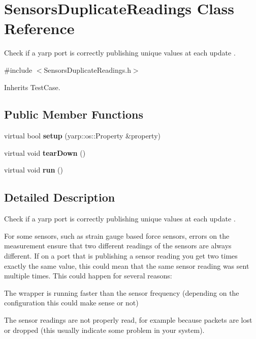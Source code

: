 \section{Sensors\+Duplicate\+Readings Class Reference}
\label{classSensorsDuplicateReadings}


Check if a yarp port is correctly publishing unique values at each update .  




{\ttfamily \#include $<$Sensors\+Duplicate\+Readings.\+h$>$}



Inherits Test\+Case.

\subsection*{Public Member Functions}
\begin{DoxyCompactItemize}
\item 
\mbox{\label{classSensorsDuplicateReadings_ab59f0ef1631d3e9e32319d7258cfb1f8}} 
virtual bool {\bfseries setup} (yarp\+::os\+::\+Property \&property)
\item 
\mbox{\label{classSensorsDuplicateReadings_a985c191f7133ff39409a5d30f93316cf}} 
virtual void {\bfseries tear\+Down} ()
\item 
\mbox{\label{classSensorsDuplicateReadings_a4c03abe12e3dadaaa13a26a537a897e3}} 
virtual void {\bfseries run} ()
\end{DoxyCompactItemize}


\subsection{Detailed Description}
Check if a yarp port is correctly publishing unique values at each update . 

For some sensors, such as strain gauge based force sensors, errors on the measurement ensure that two different readings of the sensors are always different. If on a port that is publishing a sensor reading you get two times exactly the same value, this could mean that the same sensor reading was sent multiple times. This could happen for several reasons\+:
\begin{DoxyItemize}
\item The wrapper is running faster than the sensor frequency (depending on the configuration this could make sense or not)
\item The sensor readings are not properly read, for example because packets are lost or dropped (this usually indicate some problem in your system).
\end{DoxyItemize}

